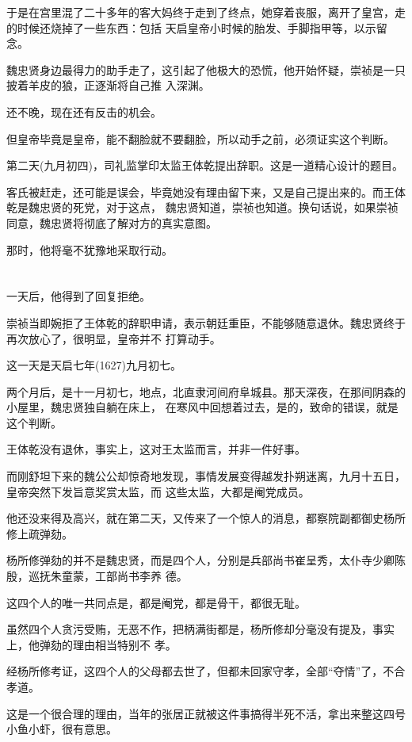 \documentclass[11pt,a4paper,onecolumn]{article}
\begin{document}
于是在宫里混了二十多年的客大妈终于走到了终点，她穿着丧服，离开了皇宫，走的时候还烧掉了一些东西：包括
天启皇帝小时候的胎发、手脚指甲等，以示留念。

魏忠贤身边最得力的助手走了，这引起了他极大的恐慌，他开始怀疑，崇祯是一只披着羊皮的狼，正逐渐将自己推
入深渊。

还不晚，现在还有反击的机会。

但皇帝毕竟是皇帝，能不翻脸就不要翻脸，所以动手之前，必须证实这个判断。

第二天(九月初四)，司礼监掌印太监王体乾提出辞职。这是一道精心设计的题目。

客氏被赶走，还可能是误会，毕竟她没有理由留下来，又是自己提出来的。而王体乾是魏忠贤的死党，对于这点，
魏忠贤知道，崇祯也知道。换句话说，如果崇祯同意，魏忠贤将彻底了解对方的真实意图。

那时，他将毫不犹豫地采取行动。

\section[\thesection]{}

一天后，他得到了回复\myrule 拒绝。

崇祯当即婉拒了王体乾的辞职申请，表示朝廷重臣，不能够随意退休。魏忠贤终于再次放心了，很明显，皇帝并不
打算动手。

这一天是天启七年(1627)九月初七。

两个月后，是十一月初七，地点，北直隶河间府阜城县。那天深夜，在那间阴森的小屋里，魏忠贤独自躺在床上，
在寒风中回想着过去，是的，致命的错误，就是这个判断。

王体乾没有退休，事实上，这对王太监而言，并非一件好事。

而刚舒坦下来的魏公公却惊奇地发现，事情发展变得越发扑朔迷离，九月十五日，皇帝突然下发旨意奖赏太监，而
这些太监，大都是阉党成员。

他还没来得及高兴，就在第二天，又传来了一个惊人的消息，都察院副都御史杨所修上疏弹劾。

杨所修弹劾的并不是魏忠贤，而是四个人，分别是兵部尚书崔呈秀，太仆寺少卿陈殷，巡抚朱童蒙，工部尚书李养
德。

这四个人的唯一共同点是，都是阉党，都是骨干，都很无耻。

虽然四个人贪污受贿，无恶不作，把柄满街都是，杨所修却分毫没有提及，事实上，他弹劾的理由相当特别\myrule 不
孝。

经杨所修考证，这四个人的父母都去世了，但都未回家守孝，全部``夺情''了，不合孝道。

这是一个很合理的理由，当年的张居正就被这件事搞得半死不活，拿出来整这四号小鱼小虾，很有意思。
\end{document}
